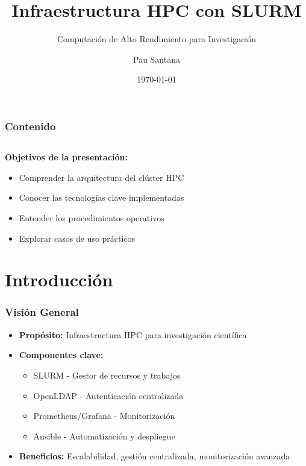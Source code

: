 \documentclass[aspectratio=169]{beamer}
\title{Infraestructura HPC con SLURM}
\subtitle{Computación de Alto Rendimiento para Investigación}
\author{Pau Santana}
\institute{CientiGO}
\date{\today}
\begin{document}
\begin{frame}
\titlepage
\end{frame}

\begin{frame}
\frametitle{Contenido}
\begin{columns}
\tableofcontents[sections={1-4}]
\tableofcontents[sections={5-9}]
\end{columns}

\vspace{0.5cm}
\begin{center}
\textbf{Objetivos de la presentación:}
\begin{itemize}
    \item Comprender la arquitectura del clúster HPC
    \item Conocer las tecnologías clave implementadas
    \item Entender los procedimientos operativos
    \item Explorar casos de uso prácticos
\end{itemize}
\end{center}
\end{frame}

\section{Introducción}

\begin{frame}
\frametitle{Visión General}
\begin{itemize}
    \item \textbf{Propósito:} Infraestructura HPC para investigación científica
    \item \textbf{Componentes clave:}
    \begin{itemize}
        \item SLURM - Gestor de recursos y trabajos
        \item OpenLDAP - Autenticación centralizada
        \item Prometheus/Grafana - Monitorización
        \item Ansible - Automatización y despliegue
    \end{itemize}
    \item \textbf{Beneficios:} Escalabilidad, gestión centralizada, monitorización avanzada
\end{itemize}
\end{frame}
\end{document}
